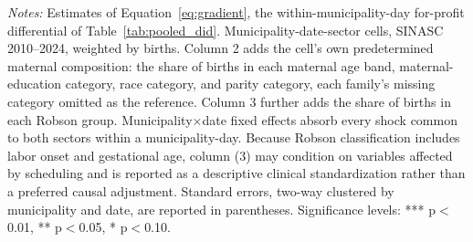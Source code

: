\begin{table}[H]
   \par \raggedright 
   \footnotesize\textit{Notes:} Estimates of Equation~\eqref{eq:gradient}, the within-municipality-day for-profit differential of Table~\ref{tab:pooled_did}. Municipality-date-sector cells, SINASC 2010--2024, weighted by births. Column 2 adds the cell's own predetermined maternal composition: the share of births in each maternal age band, maternal-education category, race category, and parity category, each family's missing category omitted as the reference. Column 3 further adds the share of births in each Robson group. Municipality$\times$date fixed effects absorb every shock common to both sectors within a municipality-day. Because Robson classification includes labor onset and gestational age, column (3) may condition on variables affected by scheduling and is reported as a descriptive clinical standardization rather than a preferred causal adjustment. Standard errors, two-way clustered by municipality and date, are reported in parentheses. \footnotesize Significance levels: *** p$<$0.01, ** p$<$0.05, * p$<$0.10.
\end{table}


